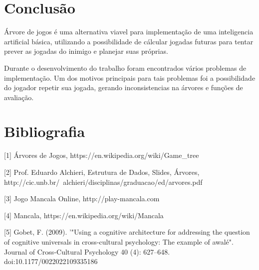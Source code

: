 \documentclass[a4paper, 12pt]{article}
\begin{document}
	\section{Conclusão}
		\textrm{Árvore de jogos é uma alternativa viavel para implementação de uma inteligencia artificial básica, utilizando a possibilidade de cálcular jogadas futuras para tentar prever as jogadas do inimigo e planejar suas próprias.}
		
		\textrm{Durante o desenvolvimento do trabalho foram encontrados vários problemas de implementação. Um dos motivos principais para tais problemas foi a possibilidade do jogador repetir sua jogada, gerando inconsistencias na árvores e funções de avaliação.}
		
	\section{Bibliografia}
	    [1] Árvores de Jogos, https://en.wikipedia.org/wiki/Game_tree
	
		[2] Prof. Eduardo Alchieri, Estrutura de Dados, Slides, Árvores, http://cic.unb.br/~alchieri/disciplinas/graduacao/ed/arvores.pdf 
		
		[3] Jogo Mancala Online, http://play-mancala.com
		
		[4] Mancala, https://en.wikipedia.org/wiki/Mancala
	
		[5] Gobet, F. (2009). '"Using a cognitive architecture for addressing the question of cognitive universals in cross-cultural psychology: The example of awalé". Journal of Cross-Cultural Psychology 40 (4): 627–648. doi:10.1177/0022022109335186
		
		
		
\end{document}
